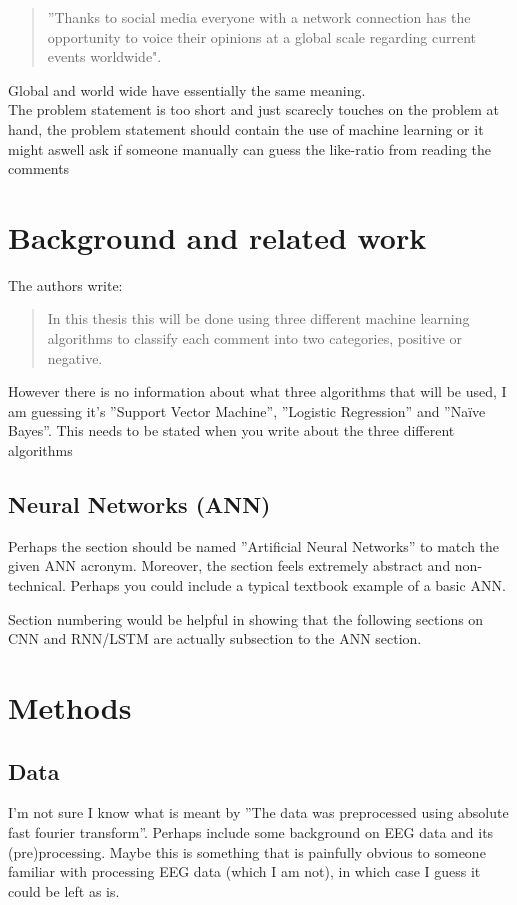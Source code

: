 \documentclass[a4paper,12pt]{article}
\begin{document}
\begin{quote}
''Thanks to social media everyone with a network connection has the opportunity to
voice their opinions at a global scale regarding current events
worldwide".
\end{quote}

\noindent Global and world wide have essentially the same meaning.\\
The problem statement is too short and just scarecly touches on the problem at hand, the problem statement should contain the use of machine learning or it might aswell ask if someone manually can guess the like-ratio from reading the comments


\section{Background and related work}
The authors write:

\begin{quote}
    In this thesis this will be done using three
    different machine learning algorithms to classify each comment into
    two categories, positive or negative.
\end{quote}

\noindent
However there is no information about what three algorithms that will be used, I am guessing it's ''Support Vector Machine'', ''Logistic Regression'' and ''Naïve Bayes''. This needs to be stated when you write about the three different algorithms 

\subsection{Neural Networks (ANN)}
Perhaps the section should be named ''Artificial Neural Networks'' to match the given ANN acronym.
Moreover, the section feels extremely abstract and non-technical. Perhaps you could include a
typical textbook example of a basic ANN.

Section numbering would be helpful in showing that the following sections on CNN and RNN/LSTM
are actually subsection to the ANN section.

\section{Methods}
\subsection{Data}
I'm not sure I know what is meant by ''The data was preprocessed using absolute fast fourier
transform''. Perhaps include some background on EEG data and its (pre)processing. Maybe this is
something that is painfully obvious to someone familiar with processing EEG data (which I am not),
in which case I guess it could be left as is.
\end{document}
